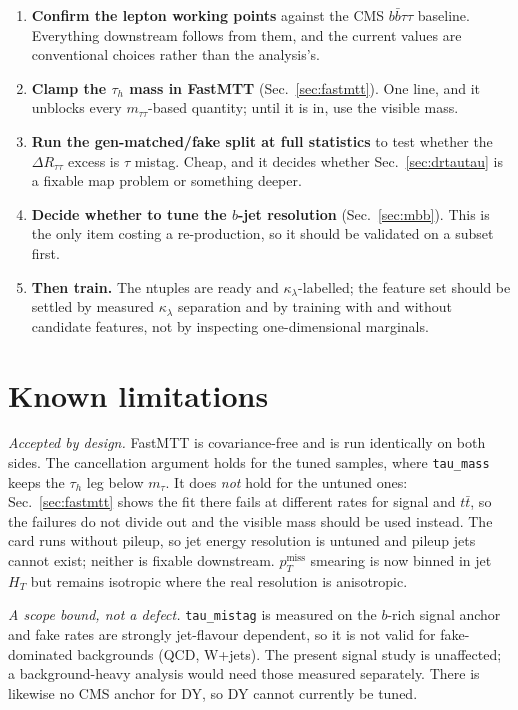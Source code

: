 \documentclass[11pt,a4paper]{article}
\newcommand{\tauh}{\tau_{h}}
\newcommand{\mtautau}{m_{\tau\tau}}
\newcommand{\mtau}{m_{\tau}}
\newcommand{\kl}{\kappa_{\lambda}}
\newcommand{\dR}{\Delta R}
\newcommand{\ptmiss}{p_{T}^{\mathrm{miss}}}
\begin{document}
\begin{enumerate}\itemsep2pt
\item \textbf{Confirm the lepton working points} against the CMS $b\bar b\tau\tau$ baseline.
      Everything downstream follows from them, and the current values are conventional
      choices rather than the analysis's.
\item \textbf{Clamp the $\tauh$ mass in FastMTT} (Sec.~\ref{sec:fastmtt}). One line, and
      it unblocks every $\mtautau$-based quantity; until it is in, use the visible mass.
\item \textbf{Run the gen-matched/fake split at full statistics} to test whether the
      $\dR_{\tau\tau}$ excess is $\tau$ mistag. Cheap, and it decides whether
      Sec.~\ref{sec:drtautau} is a fixable map problem or something deeper.
\item \textbf{Decide whether to tune the $b$-jet resolution} (Sec.~\ref{sec:mbb}). This is
      the only item costing a re-production, so it should be validated on a subset first.
\item \textbf{Then train.} The ntuples are ready and $\kl$-labelled; the feature set should
      be settled by measured $\kl$ separation and by training with and without candidate
      features, not by inspecting one-dimensional marginals.
\end{enumerate}

\section{Known limitations}
\label{sec:limits}

\emph{Accepted by design.} FastMTT is covariance-free and is run identically on both sides.
The cancellation argument
holds for the tuned samples, where \texttt{tau\_mass} keeps the $\tauh$ leg below $\mtau$. It
does \emph{not} hold for the untuned ones: Sec.~\ref{sec:fastmtt} shows the fit there fails at
different rates for signal and $t\bar t$, so the failures do not divide out and the visible
mass should be used instead. The card runs without pileup, so jet energy resolution is untuned and pileup jets
cannot exist; neither is fixable downstream. $\ptmiss$ smearing is now binned in jet $H_{T}$
but remains isotropic where the real resolution is anisotropic.

\emph{A scope bound, not a defect.} \texttt{tau\_mistag} is measured on the $b$-rich signal
anchor and fake rates are strongly jet-flavour dependent, so it is not valid for
fake-dominated backgrounds (QCD, W+jets). The present signal study is unaffected; a
background-heavy analysis would need those measured separately. There is likewise no CMS
anchor for DY, so DY cannot currently be tuned.
\end{document}
